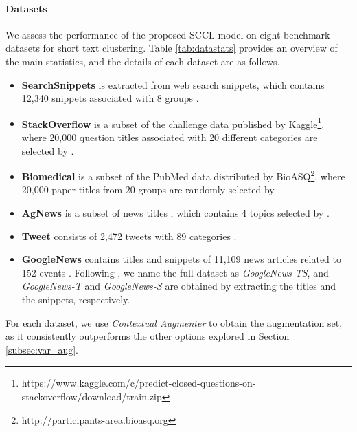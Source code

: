 \documentclass[11pt]{article}
\begin{document}
\paragraph{Datasets}
We assess the performance of the proposed SCCL model on eight benchmark datasets for short text clustering. Table \ref{tab:datastats} provides an overview of the main statistics, and the details of each dataset are as follows. 

\begin{itemize}
    \item \textbf{SearchSnippets} is extracted from web search snippets, which contains 12,340 snippets associated with 8 groups \citet{phan2008learning}.
    \item \textbf{StackOverflow} is a subset of the challenge data published by Kaggle\footnote{https://www.kaggle.com/c/predict-closed-questions-on-stackoverflow/download/train.zip}, where 20,000 question titles associated with 20 different categories are selected by \citet{xu2017self}.

    \item \textbf{Biomedical} is a subset of the PubMed data distributed by BioASQ\footnote{http://participants-area.bioasq.org}, where 20,000 paper titles from 20 groups are randomly selected by \citet{xu2017self}.

    \item \textbf{AgNews} is a subset of news
titles \citep{zhang2015text}, which contains 4 topics selected by \citet{rakib2020enhancement}. 
    \item \textbf{Tweet} consists of 2,472 tweets with 89 categories \citep{yin2016model}.

    \item \textbf{GoogleNews} contains titles and snippets of 11,109 news articles related to 152 events \citep{yin2016model}. Following \citep{rakib2020enhancement}, we name the full dataset as \textit{GoogleNews-TS}, and  \textit{GoogleNews-T} and \textit{GoogleNews-S} are obtained by extracting the titles and the snippets,  respectively. 
\end{itemize}
For each dataset, we use \textit{Contextual Augmenter} \citep{kobayashi2018contextual,ma2019nlpaug} to obtain the augmentation set, as it consistently outperforms the other options  explored in Section \ref{subsec:var_aug}.  
\end{document}
